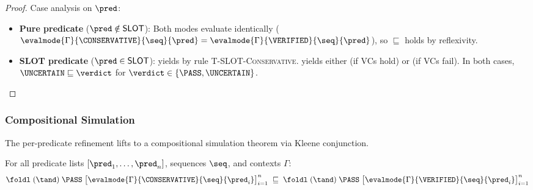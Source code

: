 \begin{proof}
Case analysis on $\pred$:
\begin{itemize}[leftmargin=*,itemsep=1pt,topsep=1pt]
\item \textbf{Pure predicate} ($\pred \notin \mathsf{SLOT}$):
  Both modes evaluate identically
  ($\evalmode{\Gamma}{\CONSERVATIVE}{\seq}{\pred} =
   \evalmode{\Gamma}{\VERIFIED}{\seq}{\pred}$),
  so $\sqsubseteq$ holds by reflexivity.

\item \textbf{SLOT predicate} ($\pred \in \mathsf{SLOT}$):
  \CONSERVATIVE{} yields \UNCERTAIN{} by rule
  \textsc{T-SLOT-Conservative}.
  \VERIFIED{} yields either \PASS{} (if VCs hold) or \UNCERTAIN{}
  (if VCs fail).
  In both cases, $\UNCERTAIN \sqsubseteq \verdict$ for
  $\verdict \in \{\PASS, \UNCERTAIN\}$.
  \qedhere
\end{itemize}
\end{proof}

\subsubsection{Compositional Simulation}

The per-predicate refinement lifts to a compositional simulation
theorem via Kleene conjunction.

\begin{theorem}\label{thm:simulation}
For all predicate lists $[\pred_1, \ldots, \pred_n]$, sequences $\seq$,
and contexts $\Gamma$:
\[
  \foldl\;(\tand)\;\PASS\;
    \bigl[\evalmode{\Gamma}{\CONSERVATIVE}{\seq}{\pred_i}\bigr]_{i=1}^n
  \;\sqsubseteq\;
  \foldl\;(\tand)\;\PASS\;
    \bigl[\evalmode{\Gamma}{\VERIFIED}{\seq}{\pred_i}\bigr]_{i=1}^n
\]
\end{theorem}

